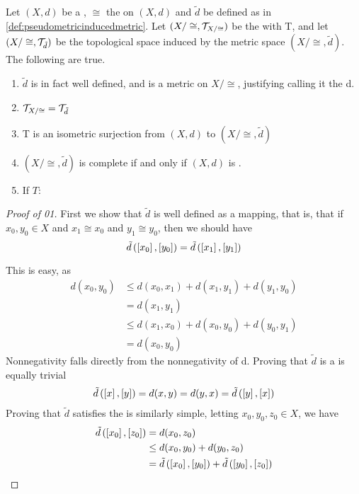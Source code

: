 \begin{prop}
    \label{prop:pseudometricinducedmetric}
    Let $(X,d)$ be a \PseudometricSpace, $\cong$ the \RelationOfZeroDistance on $(X,d)$ and $\tilde{d}$ be defined as in \ref{def:pseudometricinducedmetric}.
    Let $(X/\cong, \mathcal{T}_{X/\cong})$ be the  \QuotientTopologicalSpace with \QuotientMap T, and let $(X/\cong, \mathcal{T}_{\tilde{d}})$ be the topological space induced by the metric space $(X/\cong, \tilde{d})$. 
    The following are true. 
    \begin{enumerate}
        \item $\tilde{d}$ is in fact well defined, and is a metric on $X/\cong$, justifying calling it the \MetricInducedByPseudometric d.
        \item $\mathcal{T}_{X/\cong} = \mathcal{T}_{\tilde{d}}$
        \item T is an isometric surjection from $(X,d)$ to $(X/\cong, \tilde{d})$
        \item $(X/\cong, \tilde{d})$ is complete if and only if $(X, d)$ is \PseudometricComplete.
        \item If $T:$
    \end{enumerate}
    \begin{proof}[Proof of 01]
        First we show that $\tilde{d}$ is well defined as a mapping, that is, that if
        $x_0,y_0 \in X$ and $x_1 \cong x_0$ and $y_1 \cong y_0$, then we should have 
        \begin{equation}
            \tilde{d}\left( \left[ x_0 \right],\left[ y_0 \right]\right)=\tilde{d}\left( \left[ x_1 \right],\left[ y_1 \right]\right)
        \end{equation}
        
        This is easy, as
        \begin{align*}
            d(x_0,y_0) & \leq d(x_0,x_1)+d(x_1,y_1)+d(y_1,y_0)\\
            & = d(x_1,y_1)\\
            & \leq d(x_1,x_0)+d(x_0,y_0)+d(y_0,y_1)\\
            &=d(x_0,y_0)
         \end{align*}
         Nonnegativity falls directly from the nonnegativity of d. 
         Proving that $\tilde{d}$ is a \SymmetricMap is equally trivial
         \begin{align*}
             \tilde{d}\left( \left[ x \right], \left[ y \right]\right)= d(x,y) = d(y,x) = \tilde{d}\left( \left[ y \right], \left[ x \right]\right)
         \end{align*}
         Proving that $\tilde{d}$ satisfies the \TriangleInequality is similarly simple, letting $x_0,y_0,z_0 \in X$, we have
         \begin{align*}
             \tilde{d}\left( \left[ x_0 \right], \left[ z_0 \right]\right) & = d(x_0,z_0) \\
             & \leq d(x_0, y_0)+d(y_0, z_0)\\
             & = \tilde{d}\left( \left[ x_0 \right], \left[ y_0 \right]\right)+ \tilde{d}\left(  \left[ y_0 \right], \left[ z_0 \right]\right)
         \end{align*}
         

\end{proof}
\end{prop}
